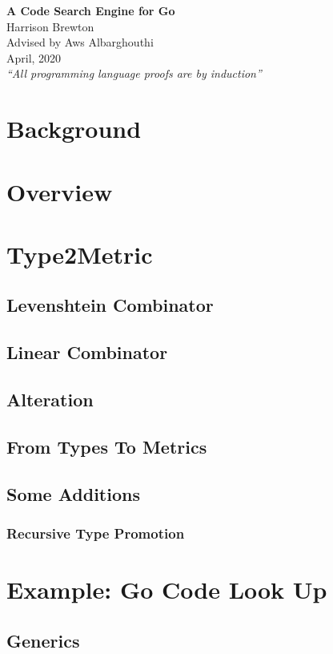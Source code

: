 \documentclass{article}
\begin{document}
{\centering \Huge \textbf{A Code Search Engine for Go} \\ 
\vspace{0.5cm}
\Large
Harrison Brewton \\
Advised by Aws Albarghouthi \\ 
April, 2020 \\
\normalsize
\vspace{0.1cm} \textit{``All programming language proofs are by induction''} \vspace{0.1cm} \par
}

\section{Background}
\section{Overview}
\section{Type2Metric}
\subsection{Levenshtein Combinator}

\subsection{Linear Combinator}

\subsection{Alteration}

\subsection{From Types To Metrics}

\subsection{Some Additions}
\subsubsection{Recursive Type Promotion}
\section{Example: Go Code Look Up}
\subsection{Generics}
\end{document}
